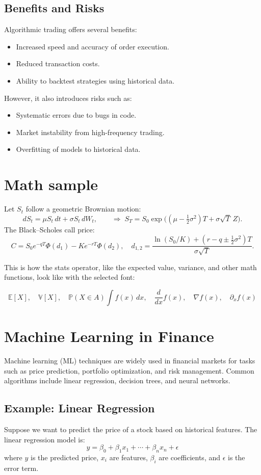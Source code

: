 \documentclass[10pt,a4paper]{article} %
\begin{document}
\subsection{Benefits and Risks}
Algorithmic trading offers several benefits:
\begin{itemize}
  \item Increased speed and accuracy of order execution.
  \item Reduced transaction costs.
  \item Ability to backtest strategies using historical data.
\end{itemize}
However, it also introduces risks such as:
\begin{itemize}
  \item Systematic errors due to bugs in code.
  \item Market instability from high-frequency trading.
  \item Overfitting of models to historical data.
\end{itemize}

\newpage
\section{Math sample}
Let $S_t$ follow a geometric Brownian motion:
\[
  dS_t = \mu S_t\,dt + \sigma S_t\,dW_t,\qquad
  \Rightarrow\;
  S_T = S_0 \exp\!\Big((\mu-\tfrac{1}{2}\sigma^2)T+\sigma\sqrt{T}\,Z\Big).
\]
The Black--Scholes call price:
\[
  C = S_0 e^{-qT}\Phi(d_1)-K e^{-rT}\Phi(d_2),
  \quad d_{1,2}=\frac{\ln(S_0/K)+(r-q\pm\tfrac{1}{2}\sigma^2)T}{\sigma\sqrt{T}}.
\]

This is how the stats operator, like the expected value, variance, and other math functions, look like with the selected font:

\[
  \mathbb{E}[X], \quad \mathbb{V}[X], \quad \mathbb{P}(X \in A)
  \int f(x)\,dx, \quad \frac{d}{dx}f(x)
  , \quad \nabla f(x), \quad \partial_x f(x)
\]

\section{Machine Learning in Finance}
Machine learning (ML) techniques are widely used in financial markets for tasks such as price prediction, portfolio optimization, and risk management. Common algorithms include linear regression, decision trees, and neural networks.

\subsection{Example: Linear Regression}
Suppose we want to predict the price of a stock based on historical features. The linear regression model is:
\[
  y = \beta_0 + \beta_1 x_1 + \cdots + \beta_n x_n + \epsilon
\]
where $y$ is the predicted price, $x_i$ are features, $\beta_i$ are coefficients, and $\epsilon$ is the error term.
\end{document}
